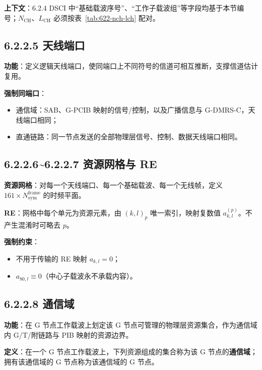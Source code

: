 \documentclass[11pt,a4paper]{ctexart}
\begin{document}
\textbf{上下文}：6.2.4 DSCI 中``基础载波序号''、``工作子载波组''等字段均基于本节编号；$N_{\mathrm{CH}}$、$L_{\mathrm{CH}}$ 必须按表~\ref{tab:622-nch-lch} 配对。

\subsection{6.2.2.5 天线端口}

\textbf{功能}：定义逻辑天线端口，使同端口上不同符号的信道可相互推断，支撑信道估计复用。

\textbf{强制同端口}：
\begin{itemize}[nosep]
  \item 通信域：SAB、G-PCIB 映射的信号/控制，以及广播信息与 G-DMRS-C，天线端口相同；
  \item 直通链路：同一节点发送的全部物理层信号、控制、数据天线端口相同。
\end{itemize}

\subsection{6.2.2.6\textasciitilde 6.2.2.7 资源网格与 RE}

\textbf{资源网格}：对每一个天线端口、每一个基础载波、每一个无线帧，定义 $161 \times N_{\mathrm{sym}}^{\mathrm{frame}}$ 的时频平面。

\textbf{RE}：网格中每个单元为资源元素，由 $(k,l)_p$ 唯一索引，映射复数值 $a_{k,l}^{(p)}$。不产生混淆时可略去 $p$。

\textbf{强制约束}：
\begin{itemize}[nosep]
  \item 不用于传输的 RE 映射 $a_{k,l}{=}0$；
  \item $a_{80,l}\equiv 0$（中心子载波永不承载内容）。
\end{itemize}

\subsection{6.2.2.8 通信域}

\textbf{功能}：在 G 节点工作载波上划定该 G 节点可管理的物理层资源集合，作为通信域内 G/T/附链路与 PIB 映射的资源边界。

\textbf{定义}：在一个 G 节点工作载波上，下列资源组成的集合称为该 G 节点的\textbf{通信域}；拥有该通信域的 G 节点称为该通信域的 G 节点。
\end{document}
